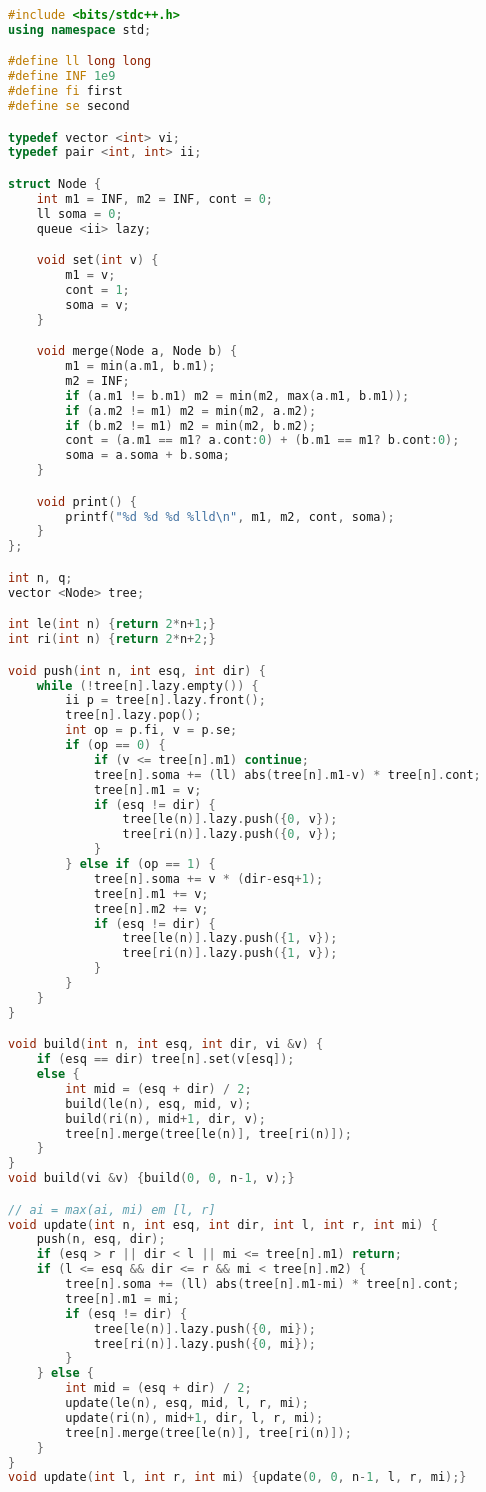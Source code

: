 \documentclass[11pt, a4paper, twoside]{article}
\begin{document}
\begin{lstlisting}[language=C++]
#include <bits/stdc++.h>
using namespace std;

#define ll long long
#define INF 1e9
#define fi first
#define se second

typedef vector <int> vi;
typedef pair <int, int> ii;

struct Node {
    int m1 = INF, m2 = INF, cont = 0;
    ll soma = 0;
    queue <ii> lazy;

    void set(int v) {
        m1 = v;
        cont = 1;
        soma = v;
    }

    void merge(Node a, Node b) {
        m1 = min(a.m1, b.m1);
        m2 = INF;
        if (a.m1 != b.m1) m2 = min(m2, max(a.m1, b.m1));
        if (a.m2 != m1) m2 = min(m2, a.m2);
        if (b.m2 != m1) m2 = min(m2, b.m2);
        cont = (a.m1 == m1? a.cont:0) + (b.m1 == m1? b.cont:0);
        soma = a.soma + b.soma;
    }

    void print() {
        printf("%d %d %d %lld\n", m1, m2, cont, soma);
    }
};

int n, q;
vector <Node> tree;

int le(int n) {return 2*n+1;}
int ri(int n) {return 2*n+2;}

void push(int n, int esq, int dir) {
    while (!tree[n].lazy.empty()) {
        ii p = tree[n].lazy.front();
        tree[n].lazy.pop();
        int op = p.fi, v = p.se;
        if (op == 0) {
            if (v <= tree[n].m1) continue;
            tree[n].soma += (ll) abs(tree[n].m1-v) * tree[n].cont;
            tree[n].m1 = v;
            if (esq != dir) {
                tree[le(n)].lazy.push({0, v});
                tree[ri(n)].lazy.push({0, v});
            }
        } else if (op == 1) {
            tree[n].soma += v * (dir-esq+1);
            tree[n].m1 += v;
            tree[n].m2 += v;
            if (esq != dir) {
                tree[le(n)].lazy.push({1, v});
                tree[ri(n)].lazy.push({1, v});
            }
        }
    }
}

void build(int n, int esq, int dir, vi &v) {
    if (esq == dir) tree[n].set(v[esq]);
    else {
        int mid = (esq + dir) / 2;
        build(le(n), esq, mid, v);
        build(ri(n), mid+1, dir, v);
        tree[n].merge(tree[le(n)], tree[ri(n)]);
    }
}
void build(vi &v) {build(0, 0, n-1, v);}

// ai = max(ai, mi) em [l, r]
void update(int n, int esq, int dir, int l, int r, int mi) {
    push(n, esq, dir);
    if (esq > r || dir < l || mi <= tree[n].m1) return;
    if (l <= esq && dir <= r && mi < tree[n].m2) {
        tree[n].soma += (ll) abs(tree[n].m1-mi) * tree[n].cont;
        tree[n].m1 = mi;
        if (esq != dir) {
            tree[le(n)].lazy.push({0, mi});
            tree[ri(n)].lazy.push({0, mi});
        }
    } else {
        int mid = (esq + dir) / 2;
        update(le(n), esq, mid, l, r, mi);
        update(ri(n), mid+1, dir, l, r, mi);
        tree[n].merge(tree[le(n)], tree[ri(n)]);
    }
}
void update(int l, int r, int mi) {update(0, 0, n-1, l, r, mi);}


\end{lstlisting}
\end{document}

